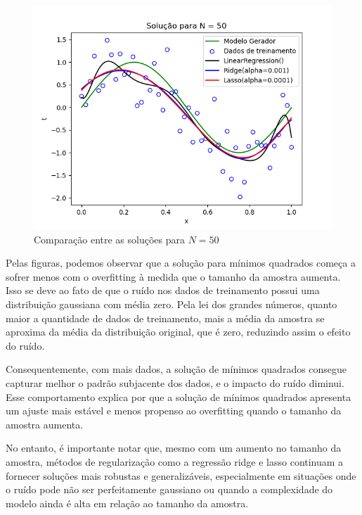 \begin{figure}[H]
    \centering
    \caption{Comparação entre as soluções para $N=50$}
    \includegraphics[width=12cm]{E1_f50.png}
\end{figure}
\begin{table}[H]
    \caption{Coeficientes para $N=50$}
\end{table}

Pelas figuras, podemos observar que a solução para mínimos quadrados começa a sofrer menos com o overfitting à medida que o tamanho da amostra aumenta. Isso se deve ao fato de que o ruído nos dados de treinamento possui uma distribuição gaussiana com média zero. Pela lei dos grandes números, quanto maior a quantidade de dados de treinamento, mais a média da amostra se aproxima da média da distribuição original, que é zero, reduzindo assim o efeito do ruído.

Consequentemente, com mais dados, a solução de mínimos quadrados consegue capturar melhor o padrão subjacente dos dados, e o impacto do ruído diminui. Esse comportamento explica por que a solução de mínimos quadrados apresenta um ajuste mais estável e menos propenso ao overfitting quando o tamanho da amostra aumenta.

No entanto, é importante notar que, mesmo com um aumento no tamanho da amostra, métodos de regularização como a regressão ridge e lasso continuam a fornecer soluções mais robustas e generalizáveis, especialmente em situações onde o ruído pode não ser perfeitamente gaussiano ou quando a complexidade do modelo ainda é alta em relação ao tamanho da amostra.






